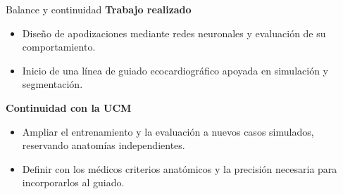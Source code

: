 \documentclass[aspectratio=169,11pt]{beamer}
\begin{document}
\begin{frame}{Balance y continuidad}
\relax
\textbf{Trabajo realizado}
\begin{itemize}
\item Diseño de apodizaciones mediante redes neuronales y evaluación de su comportamiento.
\item Inicio de una línea de guiado ecocardiográfico apoyada en simulación y segmentación.
\end{itemize}
\par\vspace{5mm}
\textbf{Continuidad con la UCM}
\begin{itemize}
\item Ampliar el entrenamiento y la evaluación a nuevos casos simulados, reservando anatomías independientes.
\item Definir con los médicos criterios anatómicos y la precisión necesaria para incorporarlos al guiado.
\end{itemize}
\end{frame}
\end{document}
